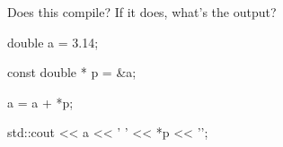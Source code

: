 Does this compile? If it does, what's the output?



\begin{consolethree}[escapeinside=||]

double a = 3.14;

const double * p = &a;

a = a + *p;



std::cout << a << ' ' << *p << '\n';

\end{consolethree}

